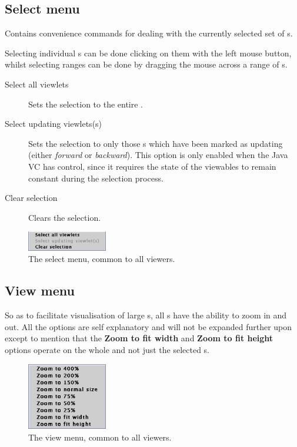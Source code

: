 \subsection{Select menu}
Contains convenience commands for dealing with the currently selected
set of \viewlet{}s.

Selecting individual \viewlet{}s can be done clicking on them with the left mouse button, whilst selecting ranges can be done by dragging the mouse across a range of \viewlet{}s.

\begin{description}
\item[Select all viewlets] Sets the selection to the entire \viewable{}.
\item[Select updating viewlets(s)] Sets the selection to only those
\viewlet{}s which have been marked as updating (either \emph{forward}
or \emph{backward}).  This option is only enabled when the Java VC has
control, since it requires the state of the viewables to remain
constant during the selection process.
\item[Clear selection] Clears the selection.
\end{description}


\begin{figure}[htsp]
\centering
\includegraphics[width=3.5cm]{vcselectmenu}
\caption{The select menu, common to all viewers.}
\label{fig:selectmenu}
\end{figure}

\subsection{View menu}

So as to facilitate visualisation of large \viewable{}s, all \viewer{}s
have the ability to zoom in and out.  All the options are self
explanatory and will not be expanded further upon except to mention
that the \textbf{Zoom to fit width} and \textbf{Zoom to fit height}
options operate on the whole \viewer{} and not just the selected
\viewlet{}s.

\begin{figure}[htsp]
\centering
\includegraphics[width=3.5cm]{vcviewmenu}
\caption{The view menu, common to all viewers.}
\label{fig:viewmenu}
\end{figure}

